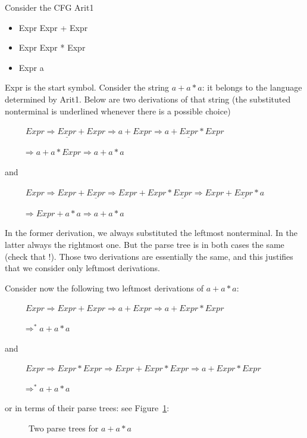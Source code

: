 Consider the CFG Arit1\label{arit1label}
\begin{itemize}
\item Expr \rpijl Expr + Expr
\item Expr \rpijl Expr * Expr
\item Expr \rpijl a
\end{itemize}
Expr is the start symbol. Consider the string $a+a*a$: it belongs to
the language determined by Arit1. Below are two derivations of that
string (the substituted nonterminal is underlined whenever there is a
possible choice)

~~~~~$Expr \Rightarrow \underline{Expr} + Expr \Rightarrow a + Expr \Rightarrow a + \underline{Expr} * Expr$

$~~~~~~~~~~\Rightarrow a + a * Expr \Rightarrow a + a * a$

and

~~~~~$Expr \Rightarrow Expr + \underline{Expr} \Rightarrow Expr + Expr * \underline{Expr} \Rightarrow Expr + \underline{Expr} * a$

$~~~~~~~~~~\Rightarrow Expr + a * a \Rightarrow a + a * a$

In the former derivation, we always substituted the leftmost
nonterminal. In the latter always the rightmost one. But the parse
tree is in both cases the same (check that !). Those two derivations
are essentially the same, and this justifies that we consider only
leftmost derivations.

Consider now the following two leftmost derivations of $a+a*a$:



~~~~~$Expr \Rightarrow Expr + Expr \Rightarrow a + Expr \Rightarrow a + Expr * Expr$

$~~~~~~~~~~\Rightarrow^* a + a * a$

and

~~~~~$Expr \Rightarrow Expr * Expr \Rightarrow Expr + Expr * Expr  \Rightarrow a + Expr * Expr$

$~~~~~~~~~~\Rightarrow^* a + a * a$

or in terms of their parse trees: see Figure~\ref{ambi1}:

\begin{figure}[h]
\caption{Two parse trees for $a+a*a$\label{ambi1}}
\end{figure}

